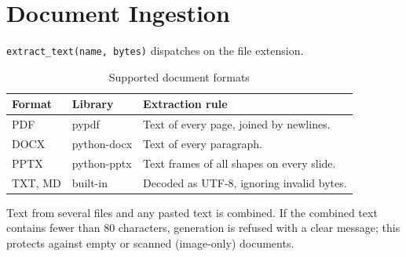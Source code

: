 \section{Document Ingestion}
\texttt{extract\_text(name, bytes)} dispatches on the file extension.
\begin{table}[H]
\centering
\begin{tabularx}{\textwidth}{@{} p{2cm} p{3.2cm} X @{}}
\toprule
\textbf{Format} & \textbf{Library} & \textbf{Extraction rule} \\
\midrule
PDF & pypdf & Text of every page, joined by newlines. \\
DOCX & python-docx & Text of every paragraph. \\
PPTX & python-pptx & Text frames of all shapes on every slide. \\
TXT, MD & built-in & Decoded as UTF-8, ignoring invalid bytes. \\
\bottomrule
\end{tabularx}
\caption{Supported document formats}
\label{tab:formats}
\end{table}
Text from several files and any pasted text is combined. If the combined text contains fewer than 80 characters, generation is refused with a clear message; this protects against empty or scanned (image-only) documents.

